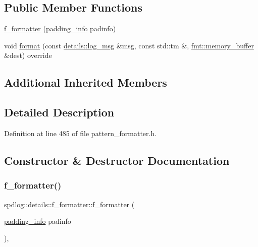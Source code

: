 \subsection*{Public Member Functions}
\begin{DoxyCompactItemize}
\item 
\hyperlink{classspdlog_1_1details_1_1f__formatter_a7e6998176a0bace8105a555ff56fce73}{f\+\_\+formatter} (\hyperlink{structspdlog_1_1details_1_1padding__info}{padding\+\_\+info} padinfo)
\item 
void \hyperlink{classspdlog_1_1details_1_1f__formatter_ab3af92f69f6a1b4a70189f4e2a7ccbba}{format} (const \hyperlink{structspdlog_1_1details_1_1log__msg}{details\+::log\+\_\+msg} \&msg, const std\+::tm \&, \hyperlink{format_8h_a21cbf729f69302f578e6db21c5e9e0d2}{fmt\+::memory\+\_\+buffer} \&dest) override
\end{DoxyCompactItemize}
\subsection*{Additional Inherited Members}


\subsection{Detailed Description}


Definition at line 485 of file pattern\+\_\+formatter.\+h.



\subsection{Constructor \& Destructor Documentation}
\mbox{\label{classspdlog_1_1details_1_1f__formatter_a7e6998176a0bace8105a555ff56fce73}} 
\subsubsection{\texorpdfstring{f\+\_\+formatter()}{f\_formatter()}}
{\footnotesize\ttfamily spdlog\+::details\+::f\+\_\+formatter\+::f\+\_\+formatter (\begin{DoxyParamCaption}\item[{\hyperlink{structspdlog_1_1details_1_1padding__info}{padding\+\_\+info}}]{padinfo }\end{DoxyParamCaption})\hspace{0.3cm}{\ttfamily [inline]}, {\ttfamily [explicit]}}



